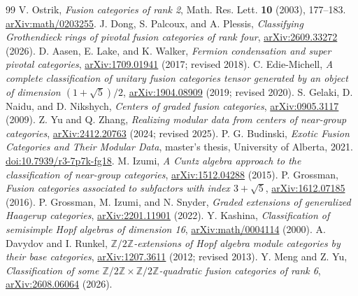 \documentclass[11pt,a4paper]{article}
\begin{document}
\begin{thebibliography}{99}\small
\setlength{\itemsep}{1pt}\setlength{\parskip}{0pt}
 V. Ostrik, \emph{Fusion categories of rank 2},
Math. Res. Lett. \textbf{10} (2003), 177--183.
\href{https://arxiv.org/abs/math/0203255}{arXiv:math/0203255}.
 J. Dong, S. Palcoux, and A. Plessis,
\emph{Classifying Grothendieck rings of pivotal fusion categories of rank four},
\href{https://arxiv.org/abs/2609.33272}{arXiv:2609.33272} (2026).
 D. Aasen, E. Lake, and K. Walker,
\emph{Fermion condensation and super pivotal categories},
\href{https://arxiv.org/abs/1709.01941}{arXiv:1709.01941} (2017; revised 2018).
 C. Edie-Michell,
\emph{A complete classification of unitary fusion categories tensor generated
by an object of dimension $(1+\sqrt5)/2$},
\href{https://arxiv.org/abs/1904.08909}{arXiv:1904.08909} (2019; revised 2020).
 S. Gelaki, D. Naidu, and D. Nikshych,
\emph{Centers of graded fusion categories},
\href{https://arxiv.org/abs/0905.3117}{arXiv:0905.3117} (2009).
 Z. Yu and Q. Zhang,
\emph{Realizing modular data from centers of near-group categories},
\href{https://arxiv.org/abs/2412.20763}{arXiv:2412.20763} (2024; revised 2025).
 P. G. Budinski,
\emph{Exotic Fusion Categories and Their Modular Data},
master's thesis, University of Alberta, 2021.
\href{https://doi.org/10.7939/r3-7p7k-fg18}{doi:10.7939/r3-7p7k-fg18}.
 M. Izumi, \emph{A Cuntz algebra approach to the
classification of near-group categories},
\href{https://arxiv.org/abs/1512.04288}{arXiv:1512.04288} (2015).
 P. Grossman,
\emph{Fusion categories associated to subfactors with index $3+\sqrt5$},
\href{https://arxiv.org/abs/1612.07185}{arXiv:1612.07185} (2016).
 P. Grossman, M. Izumi, and N. Snyder,
\emph{Graded extensions of generalized Haagerup categories},
\href{https://arxiv.org/abs/2201.11901}{arXiv:2201.11901} (2022).
 Y. Kashina,
\emph{Classification of semisimple Hopf algebras of dimension 16},
\href{https://arxiv.org/abs/math/0004114}{arXiv:math/0004114} (2000).
 A. Davydov and I. Runkel,
\emph{$\mathbb Z/2\mathbb Z$-extensions of Hopf algebra module categories by their base categories},
\href{https://arxiv.org/abs/1207.3611}{arXiv:1207.3611} (2012; revised 2013).
 Y. Meng and Z. Yu,
\emph{Classification of some $\mathbb Z/2\mathbb Z\times\mathbb Z/2\mathbb Z$-quadratic
fusion categories of rank 6},
\href{https://arxiv.org/abs/2608.06064}{arXiv:2608.06064} (2026).
\end{thebibliography}
\end{document}
